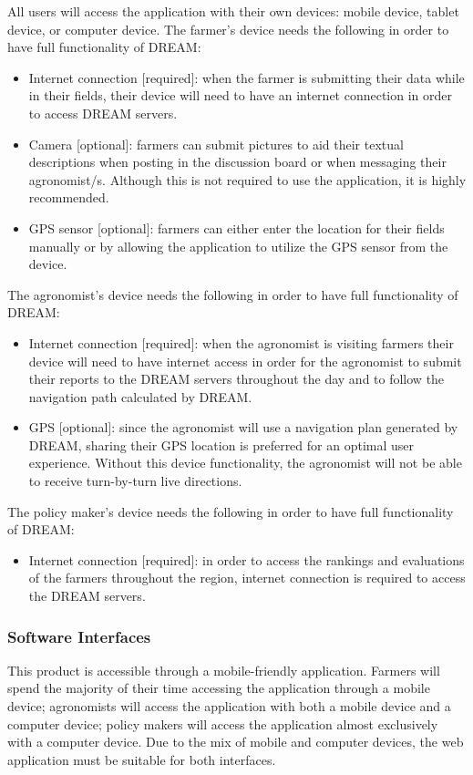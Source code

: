 \begin{flushleft}
All users will access the application with their own devices: mobile device, tablet device, or computer device. 
The farmer's device needs the following in order to have full functionality of DREAM:
\begin{itemize}
\item Internet connection [required]: when the farmer is submitting their data while in their fields, their device will need to have an internet connection in order to access DREAM servers.
\item Camera [optional]: farmers can submit pictures to aid their textual descriptions when posting in the discussion board or when messaging their agronomist/s. Although this is not required to use the application, it is highly recommended. 
\item GPS sensor [optional]: farmers can either enter the location for their fields manually or by allowing the application to utilize the GPS sensor from the device. 
\end{itemize}

The agronomist's device needs the following in order to have full functionality of DREAM:
\begin{itemize}
\item Internet connection [required]: when the agronomist is visiting farmers their device will need to have internet access in order for the agronomist to submit their reports to the DREAM servers throughout the day and to follow the navigation path calculated by DREAM.
\item GPS [optional]: since the agronomist will use a navigation plan generated by DREAM, sharing their GPS location is preferred for an optimal user experience. Without this device functionality, the agronomist will not be able to receive turn-by-turn live directions. 
\end{itemize}

The policy maker's device needs the following in order to have full functionality of DREAM:
\begin{itemize}
\item Internet connection [required]: in order to access the rankings and evaluations of the farmers throughout the region, internet connection is required to access the DREAM servers. 
\end{itemize}
\end{flushleft}

\subsubsection{Software Interfaces}
This product is accessible through a mobile-friendly application. Farmers will spend the majority of their time accessing the application through a mobile device; agronomists will access the application with both a mobile device and a computer device; policy makers will access the application almost exclusively with a computer device. Due to the mix of mobile and computer devices, the web application must be suitable for both interfaces. 


